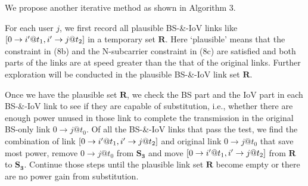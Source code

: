 \documentclass{ieeeaccess}
\begin{document}
We propose another iterative method as shown in Algorithm 3. 


For each user $j$, we first record all plausible BS-\&-IoV links like $\left[ {{\rm{0}} \to i'@{t_1},i' \to j@{t_2}} \right]$ in a temporary set $\mathbf{R}$. Here `plausible' means that the constraint in (8b) and the N-subcarrier constraint in (8c) are satisfied and both parts of the links are at speed greater than the that of the original links. Further exploration will be conducted in the plausible BS-\&-IoV link set $\mathbf{R}$.

Once we have the plausible set $\mathbf{R}$, we check the BS part and the IoV part in each BS-\&-IoV link to see if they are capable of substitution, i.e., whether there are enough power unused in those link to complete the transmission in the original BS-only link $0 \to j @{t_0}$. Of all the BS-\&-IoV links that pass the test, we find the combination of link $\left[ {{\rm{0}} \to i'@{t_1},i' \to j@{t_2}} \right]$ and original link $0 \to j @{t_0}$ that save most power, remove $0 \to j @{t_0}$ from ${{\mathbf{S}}_{\mathbf{3}}}$ and move $\left[ {{\rm{0}} \to i'@{t_1},i' \to j@{t_2}} \right]$ from $\mathbf{R}$ to ${{\mathbf{S}}_{\mathbf{3}}}$. Continue those steps until the plausible link set $\mathbf{R}$ become empty or there are no power gain from substitution.
\end{document}
